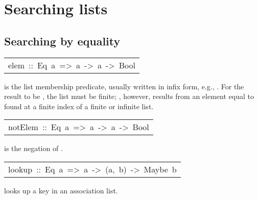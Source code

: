 \section{Searching lists
}
\subsection{Searching by equality
}
\begin{haddockdesc}
\item[\begin{tabular}{@{}l}
elem\ ::\ Eq\ a\ =>\ a\ ->\ {\char 91}a{\char 93}\ ->\ Bool
\end{tabular}]\haddockbegindoc
{} is the list membership predicate, usually written in infix form,
 e.g., .  For the result to be
 , the list must be finite; , however, results from an element equal to  found at a finite index of a finite or infinite list.
\par

\end{haddockdesc}
\begin{haddockdesc}
\item[\begin{tabular}{@{}l}
notElem\ ::\ Eq\ a\ =>\ a\ ->\ {\char 91}a{\char 93}\ ->\ Bool
\end{tabular}]\haddockbegindoc
{} is the negation of .
\par

\end{haddockdesc}
\begin{haddockdesc}
\item[\begin{tabular}{@{}l}
lookup\ ::\ Eq\ a\ =>\ a\ ->\ {\char 91}(a,\ b){\char 93}\ ->\ Maybe\ b
\end{tabular}]\haddockbegindoc
{}  looks up a key in an association list.
\par

\end{haddockdesc}
